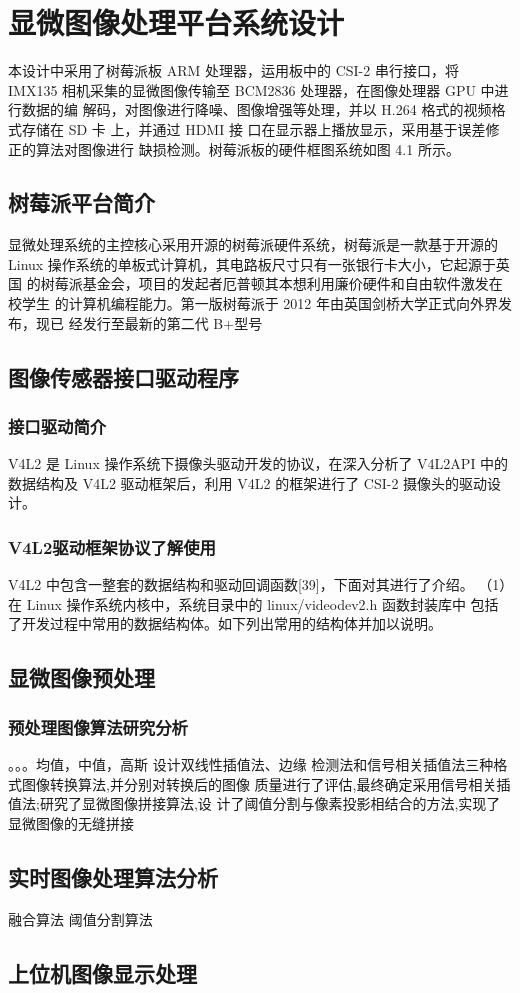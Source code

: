 \chapter{显微图像处理平台系统设计}
本设计中采用了树莓派板 ARM 处理器，运用板中的 CSI-2 串行接口，将 IMX135 相机采集的显微图像传输至 BCM2836 处理器，在图像处理器 GPU 中进行数据的编 解码，对图像进行降噪、图像增强等处理，并以 H.264 格式的视频格式存储在 SD 卡 上，并通过 HDMI 接
口在显示器上播放显示，采用基于误差修正的算法对图像进行 缺损检测。树莓派板的硬件框图系统如图 4.1 所示。
\section{树莓派平台简介}
显微处理系统的主控核心采用开源的树莓派硬件系统，树莓派是一款基于开源的 Linux 操作系统的单板式计算机，其电路板尺寸只有一张银行卡大小，它起源于英国 的树莓派基金会，项目的发起者厄普顿其本想利用廉价硬件和自由软件激发在校学生 的计算机编程能力。第一版树莓派于 2012 年由英国剑桥大学正式向外界发布，现已 经发行至最新的第二代 B+型号

\section{图像传感器接口驱动程序}
\subsection{接口驱动简介}
V4L2 是 Linux 操作系统下摄像头驱动开发的协议，在深入分析了 V4L2API 中的 数据结构及 V4L2 驱动框架后，利用 V4L2 的框架进行了 CSI-2 摄像头的驱动设计。 
\subsection{V4L2驱动框架协议了解使用}
V4L2 中包含一整套的数据结构和驱动回调函数[39]，下面对其进行了介绍。 （1）在 Linux 操作系统内核中，系统目录中的 linux/videodev2.h 函数封装库中 包括了开发过程中常用的数据结构体。如下列出常用的结构体并加以说明。


\section{显微图像预处理}
\subsection{预处理图像算法研究分析}

。。。均值，中值，高斯
设计双线性插值法、边缘
检测法和信号相关插值法三种格式图像转换算法,并分别对转换后的图像
质量进行了评估,最终确定采用信号相关插值法;研究了显微图像拼接算法,设
计了阈值分割与像素投影相结合的方法,实现了显微图像的无缝拼接

\section{实时图像处理算法分析}
融合算法
阈值分割算法

\section{上位机图像显示处理}


